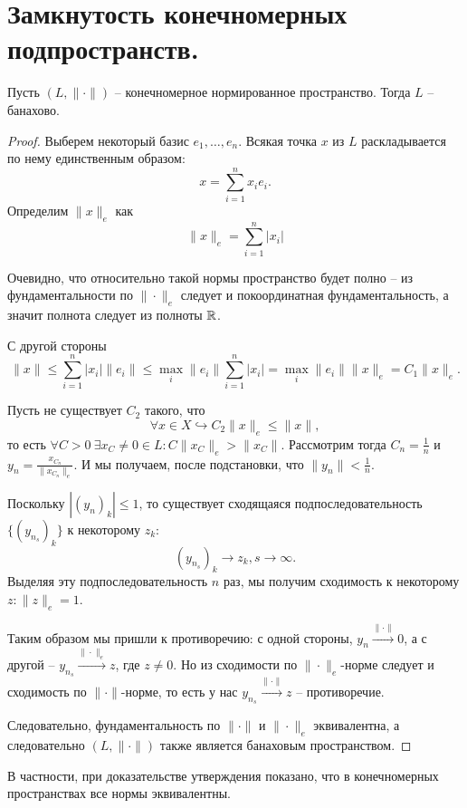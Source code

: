 \section{Замкнутость конечномерных подпространств.}
\begin{proposition}
    Пусть $(L, \|\cdot\|)$ -- конечномерное нормированное пространство.
    Тогда $L$ -- банахово.
\end{proposition}
\begin{proof}
    Выберем некоторый базис $e_1, \ldots, e_n$.
    Всякая точка $x$ из $L$ раскладывается по нему единственным образом:
    \[
        x = \sum_{i = 1}^{n} x_i e_i.
    \]
    Определим $\|x\|_e$ как
    \[
        \|x\|_e = \sum_{i = 1}^{n} |x_i|
    \]

    Очевидно, что относительно такой нормы пространство будет полно -- из фундаментальности по $\|\cdot\|_e$ следует и покоординатная фундаментальность, а значит полнота следует из полноты $\mathbb{R}$.

    С другой стороны
    \[
        \|x\| \leq \sum_{i = 1}^{n} |x_i|\|e_i\| \leq \max_{i} \|e_i\| \sum_{i = 1}^{n} |x_i| = \max_{i} \|e_i\| \|x\|_{e} = C_1\|x\|_{e}.
    \]

    Пусть не существует $C_2$ такого, что
    \[
        \forall x \in X \hookrightarrow C_2 \|x\|_e \leq \|x\|,
    \]
    то есть $\forall C > 0 \ \exists x_C \neq 0 \in L\colon C \|x_C\|_e > \|x_C\|$.
    Рассмотрим тогда $C_n = \frac{1}{n}$ и $y_n = \frac{x_{C_n}}{\|x_{C_n}\|_e}$.
    И мы получаем, после подстановки, что $\|y_n\| < \frac{1}{n}$.

    Поскольку $|(y_n)_k| \leq 1$, то существует сходящаяся подпоследовательность $\{(y_{n_s})_k\}$ к некоторому $z_k\colon$
    \[
        (y_{n_s})_k \rightarrow z_k, s \rightarrow \infty.
    \]
    Выделяя эту подпоследовательность $n$ раз, мы получим сходимость к некоторому $z\colon \|z\|_e = 1$.

    Таким образом мы пришли к противоречию: с одной стороны, $y_n \xrightarrow{\|\cdot\|} 0$, а с другой -- $y_{n_s} \xrightarrow{\|\cdot\|_e} z$, где $z \neq 0$.
    Но из сходимости по $\|\cdot\|_e$-норме следует и сходимость по $\|\cdot\|$-норме, то есть у нас $y_{n_s} \xrightarrow{\|\cdot\|} z$ -- противоречие.

    Следовательно, фундаментальность по $\|\cdot\|$ и $\|\cdot\|_e$ эквивалентна, а следовательно $(L, \|\cdot\|)$ также является банаховым пространством.
\end{proof}
\begin{note}
    В частности, при доказательстве утверждения показано, что в конечномерных пространствах все нормы эквивалентны.
\end{note}
